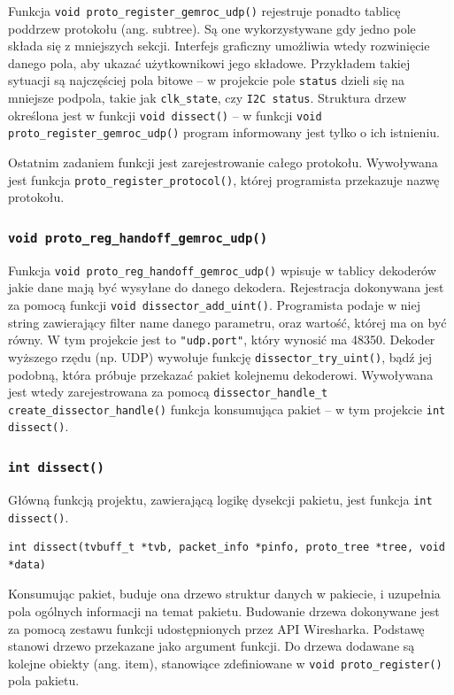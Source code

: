 \documentclass[a4paper, 12pt, twoside, openright]{article}
\begin{document}
Funkcja \texttt{void proto\_register\_gemroc\_udp()} rejestruje ponadto tablicę poddrzew protokołu (ang. subtree). Są one wykorzystywane
gdy jedno pole składa się z mniejszych sekcji. Interfejs graficzny umożliwia wtedy rozwinięcie danego pola, aby ukazać użytkownikowi jego składowe.
Przykładem takiej sytuacji są najczęściej pola bitowe -- w projekcie pole \texttt{status} dzieli się na mniejsze podpola, takie jak
\texttt{clk\_state}, czy \texttt{I2C status}. Struktura drzew określona jest w funkcji \texttt{void dissect()} -- w funkcji
\texttt{void proto\_register\_gemroc\_udp()} program informowany jest tylko o ich istnieniu.

Ostatnim zadaniem funkcji jest zarejestrowanie całego protokołu. Wywoływana jest funkcja \texttt{proto\_register\_protocol()},
której programista przekazuje nazwę protokołu.

\subsubsection{\texttt{void proto\_reg\_handoff\_gemroc\_udp()}}
\indent\par
Funkcja \texttt{void proto\_reg\_handoff\_gemroc\_udp()} wpisuje w tablicy dekoderów jakie dane mają być wysyłane do danego dekodera.
Rejestracja dokonywana jest za pomocą funkcji \texttt{void dissector\_add\_uint()}. Programista podaje w niej string zawierający filter name
danego parametru, oraz wartość, której ma on być równy. W tym projekcie jest to \texttt{"udp.port"}, który wynosić ma 48350.
Dekoder wyższego rzędu (np. UDP) wywołuje funkcję \texttt{dissector\_try\_uint()}, bądź jej podobną, która próbuje przekazać pakiet
kolejnemu dekoderowi. Wywoływana jest wtedy zarejestrowana za pomocą \texttt{dissector\_handle\_t create\_dissector\_handle()} funkcja
konsumująca pakiet -- w tym projekcie \texttt{int dissect()}.

\subsubsection{\texttt{int dissect()}}
\indent\par
Główną funkcją projektu, zawierającą logikę dysekcji pakietu, jest funkcja \texttt{int dissect()}.
\begin{lstlisting}[style=CStyleLine]
int dissect(tvbuff_t *tvb, packet_info *pinfo, proto_tree *tree, void *data)
\end{lstlisting}
Konsumując pakiet, buduje ona drzewo struktur danych w pakiecie, i uzupełnia pola ogólnych informacji na temat pakietu. Budowanie
drzewa dokonywane jest za pomocą zestawu funkcji udostępnionych przez API Wiresharka. Podstawę stanowi drzewo przekazane jako
argument funkcji. Do drzewa dodawane są kolejne obiekty (ang. item), stanowiące zdefiniowane w \texttt{void proto\_register()}
pola pakietu.
\end{document}
